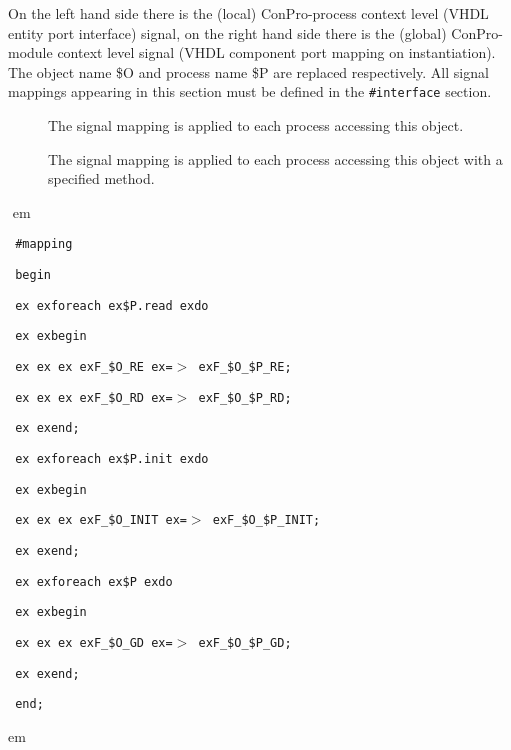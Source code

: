 \documentclass[a4paper,12pt,twoside,english]{article}
\def\s{\hskip 1.15 ex}
\begin{document}
\begin{description}
On the left hand side there is the (local) ConPro-process context level (VHDL entity port interface) signal, on the right hand side there is the (global)
ConPro-module context level signal (VHDL component port mapping on instantiation).  The object name \$O and process name \$P are replaced respectively. All
signal mappings appearing in this section  must be defined in the {\tt \#interface}  section.


\begin{description}
\item[] $ $\\
The signal mapping is applied to each process accessing this object.

\item[] $ $\\
The signal mapping is applied to each process accessing this object with a specified method.


\end{description}



\item[\colorit{\bf Example}]
\def\prefskipu{}\def\prefskipo{}\def\prefskipa{}\def\prefskipu{\hskip10pt}\def\prefskipo{\hskip10pt}\def\prefskipa{\hskip20pt}\def\content{
\vskip-5pt{\parindent0pt\parbox{\linewidth}{\tt\smallsize\hskip10pt \#mapping}}
\vskip-5pt{\parindent0pt\parbox{\linewidth}{\tt\smallsize\hskip10pt begin}}
\vskip-5pt{\parindent0pt\parbox{\linewidth}{\tt\smallsize\hskip10pt \s \s foreach\s \$P.read\s do}}
\vskip-5pt{\parindent0pt\parbox{\linewidth}{\tt\smallsize\hskip10pt \s \s begin}}
\vskip-5pt{\parindent0pt\parbox{\linewidth}{\tt\smallsize\hskip10pt \s \s \s \s F\_\$O\_RE\s =$>$\s F\_\$O\_\$P\_RE;}}
\vskip-5pt{\parindent0pt\parbox{\linewidth}{\tt\smallsize\hskip10pt \s \s \s \s F\_\$O\_RD\s =$>$\s F\_\$O\_\$P\_RD;}}
\vskip-5pt{\parindent0pt\parbox{\linewidth}{\tt\smallsize\hskip10pt \s \s end;}}
\vskip-5pt{\parindent0pt\parbox{\linewidth}{\tt\smallsize\hskip10pt \s \s foreach\s \$P.init\s do}}
\vskip-5pt{\parindent0pt\parbox{\linewidth}{\tt\smallsize\hskip10pt \s \s begin}}
\vskip-5pt{\parindent0pt\parbox{\linewidth}{\tt\smallsize\hskip10pt \s \s \s \s F\_\$O\_INIT\s =$>$\s F\_\$O\_\$P\_INIT;}}
\vskip-5pt{\parindent0pt\parbox{\linewidth}{\tt\smallsize\hskip10pt \s \s end;}}
\vskip-5pt{\parindent0pt\parbox{\linewidth}{\tt\smallsize\hskip10pt \s \s foreach\s \$P\s do}}
\vskip-5pt{\parindent0pt\parbox{\linewidth}{\tt\smallsize\hskip10pt \s \s begin}}
\vskip-5pt{\parindent0pt\parbox{\linewidth}{\tt\smallsize\hskip10pt \s \s \s \s F\_\$O\_GD\s =$>$\s F\_\$O\_\$P\_GD;}}
\vskip-5pt{\parindent0pt\parbox{\linewidth}{\tt\smallsize\hskip10pt \s \s end;}}
\vskip-5pt{\parindent0pt\parbox{\linewidth}{\tt\smallsize\hskip10pt end;}}
}
$ $
 em
\content
{} em

\end{description}
\end{document}
